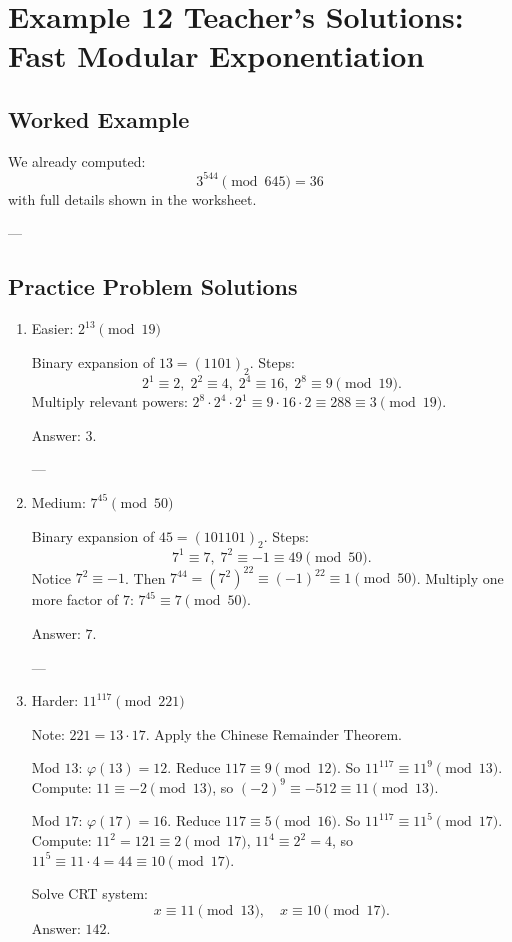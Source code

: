 \documentclass[12pt]{article}
\begin{document}
\section*{Example 12 Teacher’s Solutions: Fast Modular Exponentiation}

\subsection*{Worked Example}
We already computed:
\[
3^{544} \pmod{645} = 36
\]
with full details shown in the worksheet.

---

\subsection*{Practice Problem Solutions}

\begin{enumerate}
    \item Easier: $2^{13} \pmod{19}$

    Binary expansion of $13 = (1101)_2$.
    Steps:
    \[
    2^1 \equiv 2,\; 2^2 \equiv 4,\; 2^4 \equiv 16,\; 2^8 \equiv 9 \pmod{19}.
    \]
    Multiply relevant powers: $2^8 \cdot 2^4 \cdot 2^1 \equiv 9 \cdot 16 \cdot 2 \equiv 288 \equiv 3 \pmod{19}$.

    Answer: $\boxed{3}$.

    ---

    \item Medium: $7^{45} \pmod{50}$

    Binary expansion of $45 = (101101)_2$.
    Steps:
    \[
    7^1 \equiv 7,\; 7^2 \equiv -1 \equiv 49 \pmod{50}.
    \]
    Notice $7^2 \equiv -1$. Then $7^{44} = (7^2)^{22} \equiv (-1)^{22} \equiv 1 \pmod{50}$.
    Multiply one more factor of $7$: $7^{45} \equiv 7 \pmod{50}$.

    Answer: $\boxed{7}$.

    ---

    \item Harder: $11^{117} \pmod{221}$

    Note: $221 = 13 \cdot 17$. Apply the Chinese Remainder Theorem.

    Mod $13$: $\varphi(13) = 12$. Reduce $117 \equiv 9 \pmod{12}$. So $11^{117} \equiv 11^9 \pmod{13}$.
    Compute: $11 \equiv -2 \pmod{13}$, so $(-2)^9 \equiv -512 \equiv 11 \pmod{13}$.

    Mod $17$: $\varphi(17) = 16$. Reduce $117 \equiv 5 \pmod{16}$. So $11^{117} \equiv 11^5 \pmod{17}$.
    Compute: $11^2 = 121 \equiv 2 \pmod{17}$, $11^4 \equiv 2^2 = 4$, so $11^5 \equiv 11 \cdot 4 = 44 \equiv 10 \pmod{17}$.

    Solve CRT system:
    \[
    x \equiv 11 \pmod{13}, \quad x \equiv 10 \pmod{17}.
    \]
    Answer: $\boxed{142}$.

\end{enumerate}
\end{document}
